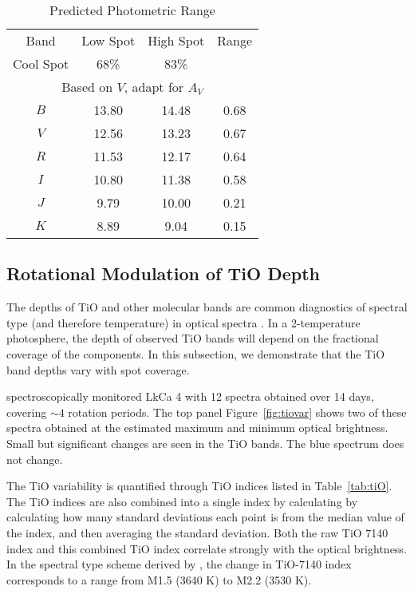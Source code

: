 \documentclass[twocolumn]{emulateapj}%
\begin{document}
\begin{table}
\caption{Predicted Photometric Range}
\label{tab:photrange}
\begin{tabular}{cccc}
\hline
Band & Low Spot & High Spot & Range\\
Cool Spot & 68\% & 83\% &\\
\hline
\multicolumn{4}{c}{Based on $V$, adapt for $A_V$}\\
$B$ & 13.80 & 14.48 & 0.68\\
$V$ & 12.56 & 13.23 & 0.67\\
$R$ & 11.53 & 12.17 & 0.64 \\
$I$ & 10.80 & 11.38 & 0.58\\
$J$ & 9.79 & 10.00 & 0.21\\
$K$ & 8.89 & 9.04 & 0.15\\
\hline
\end{tabular}
\end{table}





\subsection{Rotational Modulation of TiO Depth}

The depths of TiO and other molecular bands are common diagnostics of spectral type (and therefore temperature) in optical spectra \citep[e.g.][]{kirkpatrick91}.  In a 2-temperature photosphere, the depth of observed TiO bands will depend on the fractional coverage of the components.  In this subsection, we demonstrate that the TiO band depths vary with spot coverage.

\citet{donati14} spectroscopically monitored LkCa 4 with 12 spectra obtained over 14 days, covering $\sim 4$ rotation periods.  The top panel Figure~\ref{fig:tiovar} shows two of these spectra obtained at the estimated maximum and minimum optical brightness.  Small but significant changes are seen in the TiO bands.  The blue spectrum does not change.

The TiO variability is quantified through TiO indices listed in Table~\ref{tab:tiO}.  The TiO indices are also combined into a single index by calculating by 
calculating how many standard deviations each point is from the median value of the index, and then averaging the standard deviation.  Both the raw TiO 7140 index and this combined TiO index correlate strongly with the optical brightness.  In the spectral type scheme derived by \citet{herczeg14}, the change in TiO-7140 index corresponds to a range from M1.5 (3640 K) to M2.2 (3530 K).
\end{document}
